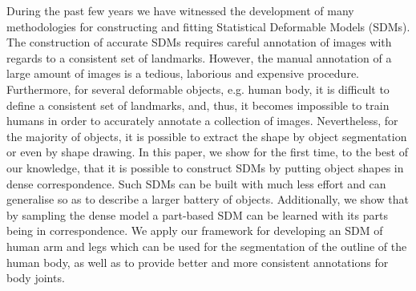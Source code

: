
During the past few years we have witnessed the development of many methodologies for constructing and fitting Statistical Deformable Models (SDMs). The construction of accurate SDMs requires careful annotation of images with regards to a consistent set of landmarks. However, the manual annotation of a large amount of images is a tedious, laborious and expensive procedure. Furthermore, for several deformable objects, e.g. human body, it is difficult to define a consistent set of landmarks, and, thus, it becomes impossible to train humans in order to accurately annotate a collection of images. Nevertheless, for the majority of objects, it is possible to extract the shape by object segmentation or even by shape drawing. In this paper, we show for the first time, to the best of our knowledge, that it is possible to construct SDMs by putting object shapes in dense correspondence. Such SDMs can be built with much less effort and can generalise so as to describe a larger battery of objects. Additionally, we show that by sampling the dense model a part-based SDM can be learned with its parts being in correspondence. We apply our framework for developing an SDM of human arm and legs which can be used for the segmentation of the outline of the human body, as well as to provide better and more consistent annotations for body joints.  